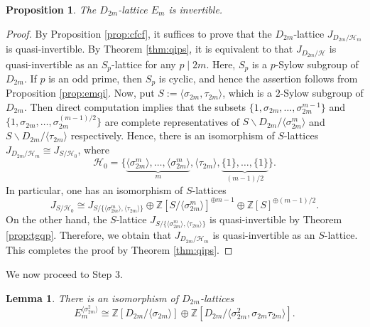 \documentclass[12pt]{amsart}
\theoremstyle{plain}
\newtheorem{prop}[thm]{Proposition}
\newtheorem{lem}[thm]{Lemma}
\theoremstyle{definition}
\numberwithin{thm}{section}
\numberwithin{equation}{section}
\newcommand{\Z}{\mathbb{Z}}
\newcommand{\cH}{\mathcal{H}}
\begin{document}
\begin{prop}\label{prop:fmiv}
The $D_{2m}$-lattice $E_{m}$ is invertible. 
\end{prop}

\begin{proof}
By Proposition \ref{prop:cfcf}, it suffices to prove that the $D_{2m}$-lattice $J_{D_{2m}/\cH_{m}}$ is quasi-invertible. By Theorem \ref{thm:qips}, it is equivalent to that $J_{D_{2m}/\cH}$ is quasi-invertible as an $S_{p}$-lattice for any $p\mid 2m$. Here, $S_{p}$ is a $p$-Sylow subgroup of $D_{2m}$. If $p$ is an odd prime, then $S_{p}$ is cyclic, and hence the assertion follows from Proposition \ref{prop:emqi}. Now, put $S:=\langle \sigma_{2m},\tau_{2m}\rangle$, which is a $2$-Sylow subgroup of $D_{2m}$. Then direct computation implies that the subsets $\{1,\sigma_{2m},\ldots,\sigma_{2m}^{m-1}\}$ and $\{1,\sigma_{2m},\ldots,\sigma_{2m}^{(m-1)/2}\}$ are complete representatives of $S\backslash D_{2m}/\langle \sigma_{2m}^{m}\rangle$ and $S\backslash D_{2m}/\langle \tau_{2m}\rangle$ respectively. Hence, there is an isomorphism of $S$-lattices $J_{D_{2m}/\cH_{m}}\cong J_{S/\cH_{0}}$, where
\begin{equation*}
\cH_{0}=\{\underbrace{\langle \sigma_{2m}^{m}\rangle,\ldots,\langle \sigma_{2m}^{m}\rangle}_{m},\langle \tau_{2m}\rangle,\underbrace{\{1\},\ldots,\{1\}}_{(m-1)/2}\}. 
\end{equation*}
In particular, one has an isomorphism of $S$-lattices
\begin{equation*}
J_{S/\cH_{0}}\cong J_{S/\{\langle \sigma_{2m}^{m}\rangle,\langle \tau_{2m}\rangle\}}\oplus \Z[S/\langle \sigma_{2m}^{m}\rangle]^{\oplus m-1}\oplus \Z[S]^{\oplus (m-1)/2}. 
\end{equation*}
On the other hand, the $S$-lattice $J_{S/\{\langle \sigma_{2m}^{m}\rangle,\langle \tau_{2m}\rangle\}}$ is quasi-invertible by Theorem \ref{prop:tgqp}. Therefore, we obtain that $J_{D_{2m}/\cH_{m}}$ is quasi-invertible as an $S$-lattice. This completes the proof by Theorem \ref{thm:qips}. 
\end{proof}

We now proceed to Step 3. 

\begin{lem}\label{lem:stfx}
There is an isomorphism of $D_{2m}$-lattices
\begin{equation*}
E_{m}^{\langle \sigma_{2m}^{2}\rangle}\cong \Z[D_{2m}/\langle \sigma_{2m}\rangle]\oplus \Z[D_{2m}/\langle \sigma_{2m}^{2},\sigma_{2m}\tau_{2m}\rangle]. 
\end{equation*}
\end{lem}
\end{document}
